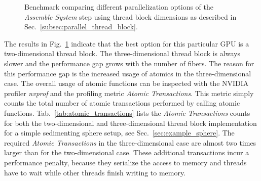 \begin{figure}[!htbp]
  \centering
  \caption[Benchmarking thread block dimensions.]{Benchmark comparing different parallelization options of the \emph{Assemble System} step using thread block dimensions as described in Sec.~\ref{subsec:parallel_thread_block}. }
  \label{fig:bench_cuda_thread_blocks}
\end{figure}

The results in Fig.~\ref{fig:bench_cuda_thread_blocks} indicate that the best option for this particular GPU is a two-dimensional thread block. The three-dimensional thread block is always slower and the performance gap grows with the number of fibers. The reason for this performance gap is the increased usage of atomics in the three-dimensional case. The overall usage of atomic functions can be inspected with the NVIDIA profiler \emph{nvprof} and the profiling metric \emph{Atomic Transactions}. This metric simply counts the total number of atomic transactions performed by calling atomic functions. Tab.~\ref{tab:atomic_transactions} lists the \emph{Atomic Transactions} counts for both the two-dimensional and three-dimensional thread block implementation for a simple sedimenting sphere setup, see Sec.~\ref{sec:example_sphere}. The required \emph{Atomic Transactions} in the three-dimensional case are almost two times larger than for the two-dimensional case. These additional transactions incur a performance penalty, because they serialize the access to memory and threads have to wait while other threads finish writing to memory.

